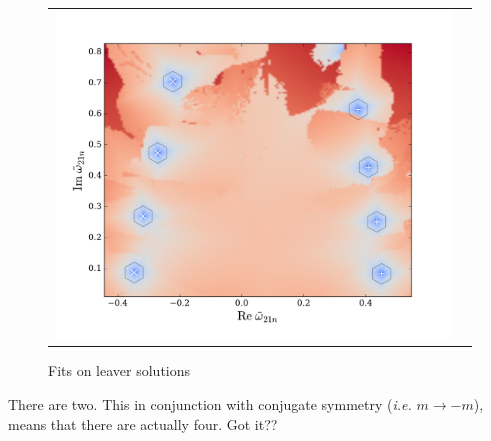 \documentclass[twocolumn,prd,floatfix,preprintnumbers,a4paper,nofootinbib,superscriptaddress]{revtex4-1}
\begin{document}
{\begin{figure}[htb]
\begin{tabular}{cc}
		\includegraphics[width=\figfactor\textwidth]{leaver_example_chi0p68_l2m1_brute_r.pdf}
	\end{tabular}
	\caption{ Fits on leaver solutions }
	\label{fig:fitsanity}
\end{figure}
%
There are two. This in conjunction with conjugate symmetry (\textit{i.e.} $m\rightarrow-m$), means that there are actually four. Got it??

}
\end{document}
